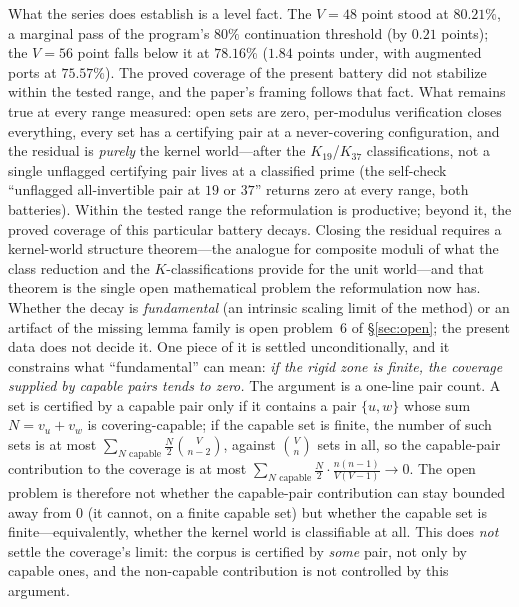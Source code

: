 What the series does establish is a level fact. The $V=48$ point stood
at $80.21\%$, a marginal pass of the program's $80\%$ continuation
threshold (by $0.21$ points); the $V=56$ point falls below it at
$78.16\%$ ($1.84$ points under, with augmented ports at $75.57\%$). The
proved coverage of the present battery did not stabilize within the
tested range, and the paper's framing follows that fact. What remains
true at every range measured: open sets are zero, per-modulus
verification closes everything, every set has a certifying pair at a
never-covering configuration, and the residual is \emph{purely} the
kernel world---after the $K_{19}$/$K_{37}$ classifications, not a single
unflagged certifying pair lives at a classified prime (the self-check
``unflagged all-invertible pair at $19$ or $37$'' returns zero at every
range, both batteries). Within the tested range the reformulation is
productive; beyond it, the proved coverage of this particular battery
decays. Closing the residual requires a kernel-world structure
theorem---the analogue for composite moduli of what the class reduction
and the $K$-classifications provide for the unit world---and that theorem
is the single open mathematical problem the reformulation now has.
Whether the decay is \emph{fundamental} (an intrinsic scaling limit of
the method) or an artifact of the missing lemma family is open
problem~6 of \S\ref{sec:open}; the present
data does not decide it. One piece of it is settled
unconditionally, and it constrains what ``fundamental'' can mean: \emph{if
the rigid zone is finite, the coverage supplied by capable pairs tends
to zero.} The argument is a one-line pair count. A set is certified by
a capable pair only if it contains a pair $\{u,w\}$ whose sum
$N=v_u+v_w$ is covering-capable; if the capable set is finite, the
number of such sets is at most
$\sum_{N\text{ capable}}\tfrac{N}{2}\binom{V}{n-2}$, against
$\binom{V}{n}$ sets in all, so the capable-pair contribution to the
coverage is at most
$\sum_{N\text{ capable}}\tfrac{N}{2}\cdot\tfrac{n(n-1)}{V(V-1)}\to 0$.
The open problem is therefore not whether the capable-pair contribution
can stay bounded away from $0$ (it cannot, on a finite capable set) but
whether the capable set is finite---equivalently, whether the kernel
world is classifiable at all. This does \emph{not} settle the coverage's
limit: the corpus is certified by \emph{some} pair, not only by capable
ones, and the non-capable contribution is not controlled by this
argument.

